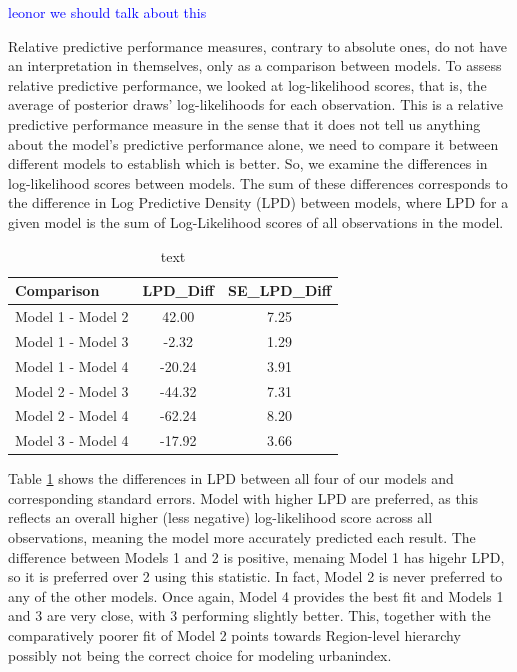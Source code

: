 \documentclass[12pt]{article}
\newcommand{\red}[1]{\textcolor{red}{#1}}
\newcommand{\blue}[1]{\textcolor{blue}{#1}}
\begin{document}
\blue{leonor we should talk about this}




Relative predictive performance measures, contrary to absolute ones, do not have an interpretation in themselves, only as a comparison between models. 
To assess relative predictive performance, we looked at log-likelihood scores, that is, the average of posterior draws' log-likelihoods for each observation.
This is a relative predictive performance measure in the sense that it does not tell us anything about the model's predictive performance alone, we need to compare it between different models to establish which is better. So, we examine the differences in log-likelihood scores between models.
The sum of these differences corresponds to the difference in Log Predictive Density (LPD) between models, where LPD for a given model is the sum of Log-Likelihood scores of all observations in the model.




\begin{table}[ht]
	\centering
	\begin{tabular}{lcc}
		\hline
		       Comparison & LPD\_Diff & SE\_LPD\_Diff \\ 
		       \midrule
		Model 1 - Model 2 &     42.00 &          7.25 \\
		Model 1 - Model 3 &     -2.32 &          1.29 \\
		Model 1 - Model 4 &    -20.24 &          3.91 \\
		Model 2 - Model 3 &    -44.32 &          7.31 \\
		Model 2 - Model 4 &    -62.24 &          8.20 \\
		Model 3 - Model 4 &    -17.92 &          3.66 \\ \hline
	\end{tabular}
	\caption{text}
	\label{tab:LPD_diff}
\end{table}

Table \ref{tab:LPD_diff} shows the differences in LPD between all four of our models and corresponding standard errors.
Model with higher LPD are preferred, as this reflects an overall higher (less negative) log-likelihood score across all observations, meaning the model more accurately predicted each result.
The difference between Models 1 and 2 is positive, menaing Model 1 has higehr LPD, so it is preferred over 2 using this statistic. In fact, Model 2 is never preferred to any of the other models. Once again, Model 4 provides the best fit and Models 1 and 3 are very close, with 3 performing slightly better. This, together with the comparatively poorer fit of Model 2 points towards Region-level hierarchy possibly not being the correct choice for modeling urbanindex.
\end{document}
